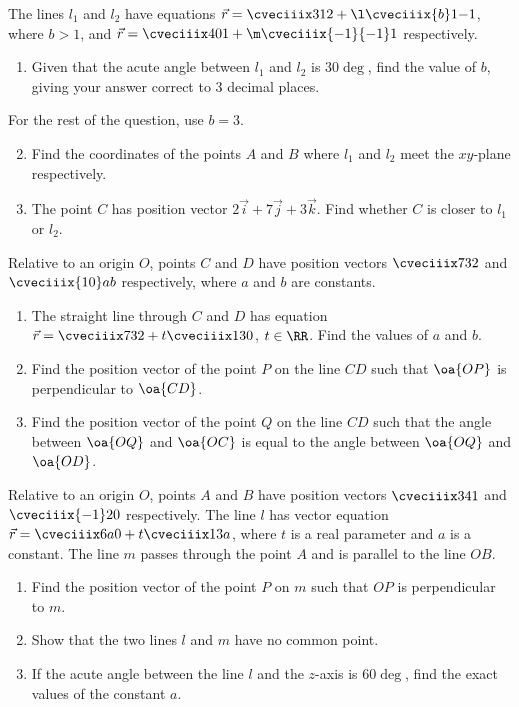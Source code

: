 \begin{problem}
    The lines $l_1$ and $l_2$ have equations $\vec r = \cveciiix312 + \l \cveciiix{b}1{-1}$, where $b > 1$, and $\vec r = \cveciiix401 + \m\cveciiix{-1}{-1}1$ respectively.

    \begin{enumerate}
        \item Given that the acute angle between $l_1$ and $l_2$ is $30\deg$, find the value of $b$, giving your answer correct to 3 decimal places.
    \end{enumerate}

    For the rest of the question, use $b = 3$.

    \begin{enumerate}
        \setcounter{enumi}{1}
        \item Find the coordinates of the points $A$ and $B$ where $l_1$ and $l_2$ meet the $xy$-plane respectively.
        \item The point $C$ has position vector $2\vec i + 7\vec j + 3\vec k$. Find whether $C$ is closer to $l_1$ or $l_2$.
    \end{enumerate}
\end{problem}

\begin{problem}
    Relative to an origin $O$, points $C$ and $D$ have position vectors $\cveciiix732$ and $\cveciiix{10}ab$ respectively, where $a$ and $b$ are constants.

    \begin{enumerate}
        \item The straight line through $C$ and $D$ has equation $\vec r = \cveciiix732 + t\cveciiix130$, $t \in \RR$. Find the values of $a$ and $b$.
        \item Find the position vector of the point $P$ on the line $CD$ such that $\oa{OP}$ is perpendicular to $\oa{CD}$.
        \item Find the position vector of the point $Q$ on the line $CD$ such that the angle between $\oa{OQ}$ and $\oa{OC}$ is equal to the angle between $\oa{OQ}$ and $\oa{OD}$.
    \end{enumerate}
\end{problem}

\begin{problem}
    Relative to an origin $O$, points $A$ and $B$ have position vectors $\cveciiix341$ and $\cveciiix{-1}20$ respectively. The line $l$ has vector equation $\vec r = \cveciiix6a0 + t\cveciiix13a$, where $t$ is a real parameter and $a$ is a constant. The line $m$ passes through the point $A$ and is parallel to the line $OB$.

    \begin{enumerate}
        \item Find the position vector of the point $P$ on $m$ such that $OP$ is perpendicular to $m$.
        \item Show that the two lines $l$ and $m$ have no common point.
        \item If the acute angle between the line $l$ and the $z$-axis is $60\deg$, find the exact values of the constant $a$.
    \end{enumerate}
\end{problem}

